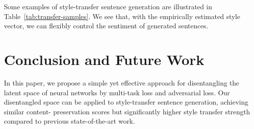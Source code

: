 \documentclass[11pt,a4paper]{article}
\begin{document}
Some examples of style-transfer sentence generation are illustrated in Table~\ref{tab:transfer-samples}. We see that, with the empirically estimated style vector, we can flexibly control the sentiment of generated sentences.


\section{Conclusion and Future Work}
In this paper, we propose a simple yet effective approach for disentangling the latent space of neural networks by multi-task loss and adversarial loss. Our disentangled space can be applied to style-transfer sentence generation, achieving similar content- preservation scores but significantly higher style transfer strength compared to previous state-of-the-art work.



\end{document}
